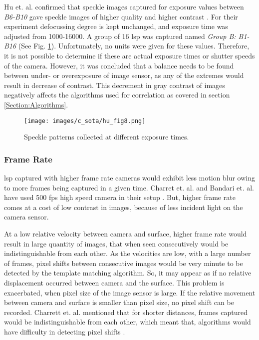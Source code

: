     \noindent Hu et. al. confirmed that speckle images captured for exposure values between \emph{B6-B10} gave speckle images of higher quality and higher contrast \noindent \cite{hu}. For their experiment defocussing degree is kept unchanged, and exposure time was adjusted from 1000-16000. A group of 16 \gls{lsp} was captured named \emph{Group B: B1-B16} (See Fig. \ref{fig:hu_fig8}). Unfortunately, no units were given for these values. Therefore, it is not possible to determine if these are actual exposure times or shutter speeds of the camera. However, it was concluded that a balance needs to be found between under- or overexposure of image sensor, as any of the extremes would result in decrease of contrast. This decrement in gray contrast of images negatively affects the algorithms used for correlation as covered in section \ref{Section:Algorithms}.

    \begin{figure}[h]
        \centering
        \texttt{[image: images/c\_sota/hu\_fig8.png]}
        \caption{Speckle patterns collected at different exposure times. \cite{hu}}
        \label{fig:hu_fig8}
    \end{figure}

    \subsubsection*{Frame Rate}\label{Subsubsection:Frame_Rate}
    \Gls{lsp} captured with higher frame rate cameras would exhibit less motion blur owing to more frames being captured in a given time. Charret et. al. and Bandari et. al. have used 500 \gls{fps} high speed camera in their setup \cite{charrett_2018} \cite{bandari}. But, higher frame rate comes at a cost of low contrast in images, because of less incident light on the camera sensor. 

    \vspace{5mm}
    \noindent At a low relative velocity between camera and surface, higher frame rate would result in large quantity of images, that when seen consecutively would be indistinguishable from each other. As the velocities are low, with a large number of frames, pixel shifts between consecutive images would be very minute to be detected by the template matching algorithm. So, it may appear as if no relative displacement occurred between camera and the surface. This problem is exacerbated, when pixel size of the image sensor is large. If the relative movement between camera and surface is smaller than pixel size, no pixel shift can be recorded. Charrett et. al. mentioned that for shorter distances, frames captured would be indistinguishable from each other, which meant that, algorithms would have difficulty in detecting pixel shifts \cite{charrett_mars}.

